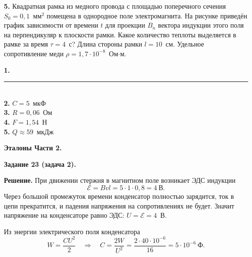 \documentclass[12pt,a4paper]{article}
\begin{document}
\begin{taskadvanced}
\textbf{5.} Квадратная рамка из медного провода с площадью поперечного сечения
$S_0=0{,}1$~мм$^2$ помещена в однородное поле электромагнита. На рисунке приведён график зависимости
от времени $t$ для проекции $B_n$ вектора индукции этого поля на перпендикуляр к плоскости рамки.
Какое количество теплоты выделяется в рамке за время $\tau=4$~с? Длина стороны рамки $l=10$~см.
Удельное сопротивление меди $\rho=1{,}7\cdot10^{-8}$~Ом$\cdot$м.

\nopagebreak\smallskip
\begin{center}
\end{center}
\end{taskadvanced}

\newpage
{}

\textbf{1.} \rule{4cm}{0.4pt}\\[0.3em]
\textbf{2.} $C=5$~мкФ\\[0.3em]
\textbf{3.} $R=0{,}06$~Ом\\[0.3em]
\textbf{4.} $F=1{,}54$~Н\\[0.3em]
\textbf{5.} $Q\approx59$~мкДж

\medskip
\textbf{Эталоны Части 2.}

\begin{solutionbox}
\textbf{Задание 23 (задача 2).}

\textbf{Решение.} При движении стержня в магнитном поле возникает ЭДС индукции
\[ \mathcal{E}=Bvl=5\cdot1\cdot0{,}8=4\ \text{В}. \]
Через большой промежуток времени конденсатор полностью зарядится, ток в цепи прекратится, и падения
напряжения на сопротивлениях не будет. Значит напряжение на конденсаторе равно ЭДС: $U=\mathcal{E}=4$~В.

Из энергии электрического поля конденсатора
\[ W=\frac{CU^{2}}{2}\quad\Longrightarrow\quad
C=\frac{2W}{U^{2}}=\frac{2\cdot40\cdot10^{-6}}{16}=5\cdot10^{-6}\ \text{Ф}. \]
\end{solutionbox}
\end{document}
